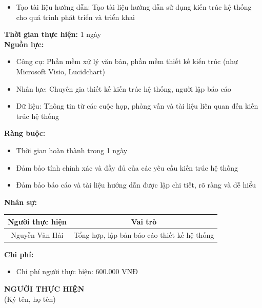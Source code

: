 {\begin{minipage}{\textwidth}
\begin{itemize}
        \item Tạo tài liệu hướng dẫn: Tạo tài liệu hướng dẫn sử dụng kiến trúc hệ thống cho quá trình phát triển và triển khai
    \end{itemize}
    \vspace{0.5cm}
    \noindent \textbf{Thời gian thực hiện:} 1 ngày \\
    \noindent \textbf{Nguồn lực:}
    \begin{itemize}
        \item Công cụ: Phần mềm xử lý văn bản, phần mềm thiết kế kiến trúc (như Microsoft Visio, Lucidchart)
        \item Nhân lực: Chuyên gia thiết kế kiến trúc hệ thống, người lập báo cáo
        \item Dữ liệu: Thông tin từ các cuộc họp, phỏng vấn và tài liệu liên quan đến kiến trúc hệ thống
    \end{itemize}
    \vspace{0.5cm}
    \noindent \textbf{Ràng buộc:}
    \begin{itemize}
        \item Thời gian hoàn thành trong 1 ngày
        \item Đảm bảo tính chính xác và đầy đủ của các yêu cầu kiến trúc hệ thống
        \item Đảm bảo báo cáo và tài liệu hướng dẫn được lập chi tiết, rõ ràng và dễ hiểu
    \end{itemize}
    \vspace{0.5cm}
    \noindent \textbf{Nhân sự:}
    \begin{longtable}{|c|c|}
    \hline
    \textbf{Người thực hiện} & \textbf{Vai trò} \\
    \hline
    Nguyễn Văn Hải & Tổng hợp, lập bản báo cáo thiết kế hệ thống \\
    \hline
    \end{longtable}
    \vspace{0.5cm}
    \noindent \textbf{Chi phí:}
    \begin{itemize}
        \item Chi phí người thực hiện: 600.000 VNĐ
    \end{itemize}
    \vspace{1cm}
    \begin{flushleft}
        \hspace{8cm} \textbf{NGƯỜI THỰC HIỆN} \\
        \hspace{8.8cm} (Ký tên, họ tên) \\
        \vspace{1cm}
    \end{flushleft}
    \end{minipage}
}
% 
